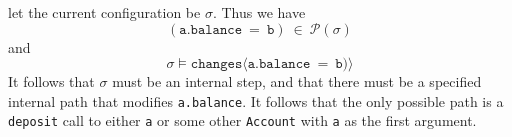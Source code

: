 \documentclass[12pt]{article}
\begin{document}
\noindent
let the current configuration be $\sigma$. Thus we have
$$(\texttt{a.balance}\ = \ \texttt{b})\ \in\ \mathcal{P}(\sigma)$$ and 
$$\sigma \vDash \texttt{changes}\langle\texttt{a.balance}\ = \ \texttt{b})\rangle$$
It follows that $\sigma$ must be an internal step, and that there must be a specified 
internal path that modifies \texttt{a.balance}.
It follows that the only possible path is a \texttt{deposit} call to either \texttt{a}
or some other \texttt{Account} with \texttt{a} as the first argument.

% 
%













\end{document}
